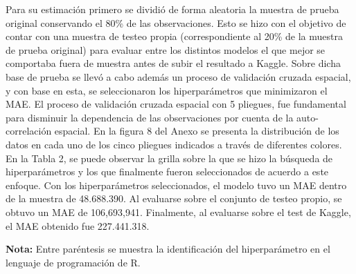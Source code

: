 \documentclass[a4paper]{article}
\theoremstyle{remark}
\theoremstyle{definition}
\begin{document}
Para su estimación primero se dividió de forma aleatoria la muestra de prueba original conservando el 80\% de las observaciones. Esto se hizo con el objetivo de contar con una muestra de testeo propia (correspondiente al 20\% de la muestra de prueba original) para evaluar entre los distintos modelos el que mejor se comportaba fuera de muestra antes de subir el resultado a Kaggle. Sobre dicha base de prueba se llevó a cabo además un proceso de validación cruzada espacial, y con base en esta, se seleccionaron los hiperparámetros que minimizaron el MAE. El proceso de validación cruzada espacial con 5 pliegues, fue fundamental para disminuir la dependencia de las observaciones por cuenta de  la auto-correlación espacial. En la figura 8 del Anexo se presenta la distribución de los datos en cada uno de los cinco pliegues indicados a través de diferentes colores. En la Tabla 2, se puede observar la grilla sobre la que se hizo la búsqueda de hiperparámetros y los que finalmente fueron seleccionados de acuerdo a este enfoque. Con los hiperparámetros seleccionados,  el modelo tuvo un MAE dentro de la muestra de 48.688.390. Al evaluarse sobre el conjunto de testeo propio, se obtuvo un MAE de 106,693,941. Finalmente, al evaluarse sobre el test de Kaggle, el MAE obtenido fue 227.441.318. 


\begin{table}[h!]
\centering
\caption{Hiperparámetros evaluados y seleccionados para XGBoost}
\label{tab:hiperparametros}
\vspace{0.5mm}

\scriptsize
\textbf{Nota:} Entre paréntesis se muestra la identificación del hiperparámetro en el lenguaje de programación de R.
\end{table}
\end{document}
